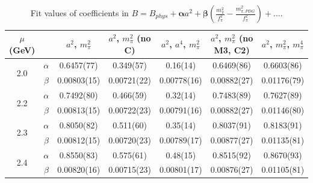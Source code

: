 \documentclass[12pt]{extarticle}
\begin{document}
\begin{table}[h!]
\begin{center}
\begin{tabular}{|c c|c|c|c|c|c|}
\hline
$\mu$ (GeV) &  & $a^2$, $m_\pi^2$& $a^2$, $m_\pi^2$ (no C)& $a^2$, $a^4$, $m_\pi^2$& $a^2$, $m_\pi^2$ (no M3, C2)& $a^2$, $m_\pi^2$, $m_\pi^4$\\
\hline
\multirow{2}{0.5in}{2.0} & $\alpha$ & 0.6457(77)& 0.349(57)& 0.16(14)& 0.6469(86)& 0.6603(86)\\
 & $\beta$ & 0.00803(15)& 0.00721(22)& 0.00778(16)& 0.00882(27)& 0.01176(79)\\
\hline
\multirow{2}{0.5in}{2.2} & $\alpha$ & 0.7492(80)& 0.466(59)& 0.32(14)& 0.7483(89)& 0.7627(89)\\
 & $\beta$ & 0.00813(15)& 0.00722(23)& 0.00791(16)& 0.00882(27)& 0.01146(80)\\
\hline
\multirow{2}{0.5in}{2.3} & $\alpha$ & 0.8050(82)& 0.511(60)& 0.35(14)& 0.8037(91)& 0.8183(91)\\
 & $\beta$ & 0.00812(15)& 0.00720(23)& 0.00789(17)& 0.00877(27)& 0.01135(81)\\
\hline
\multirow{2}{0.5in}{2.4} & $\alpha$ & 0.8550(83)& 0.575(61)& 0.48(15)& 0.8515(92)& 0.8670(93)\\
 & $\beta$ & 0.00820(16)& 0.00715(23)& 0.00801(17)& 0.00876(27)& 0.01105(81)\\
\hline
\end{tabular}
\caption{Fit values of coefficients in $B = B_{phys} + \mathbf{\alpha} a^2 + \mathbf{\beta}\left(\frac{m_\pi^2}{f_\pi^2}-\frac{m_{\pi,PDG}^2}{f_\pi^2}\right) + \ldots$.}
\end{center}
\end{table}




















\clearpage
\end{document}
